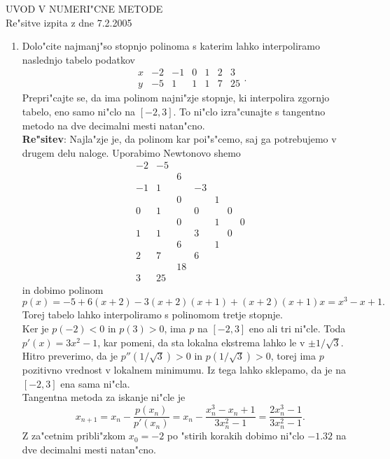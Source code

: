 

\begin{center}
  {\large UVOD V NUMERI"CNE METODE\\
    Re"sitve izpita z dne 7.2.2005\\
    }
\end{center}
\vspace{0.5cm}

\begin{enumerate}

  \item Dolo"cite najmanj"so stopnjo polinoma s katerim
    lahko interpoliramo naslednjo tabelo podatkov
    $$\begin{array}{r|rrrrrr}
      x & -2 & -1 & 0 & 1 & 2 & 3\\ \hline
      y & -5 & 1  & 1 & 1 & 7 & 25
      \end{array}.
    $$
    Prepri"cajte se, da ima polinom najni"zje stopnje, ki interpolira
    zgornjo tabelo, eno samo ni"clo na $[-2,3]$. To ni"clo izra"cunajte s
    tangentno metodo na dve decimalni mesti natan"cno.\\
    {\bf Re"sitev}: Najla"zje je, da polinom kar poi"s"cemo, saj ga
    potrebujemo v drugem delu naloge. Uporabimo Newtonovo shemo
    $$\begin{array}{rrrrrrr}
      -2 & -5 &   &   &   &   &\\
         &    & 6 &   &   &   &\\
      -1 &  1 &   & -3&   &   &\\
         &    & 0 &   & 1 &   &\\
       0 &  1 &   & 0 &   & 0 &\\
         &    & 0 &   & 1 &   &0\\
       1 &  1 &   & 3 &   & 0 &\\
         &    & 6 &   & 1 &   &\\
       2 &  7 &   & 6 &   &   &\\
         &    & 18&   &   &   &\\
       3 & 25 &   &   &   &   &
      \end{array}
    $$
    in dobimo polinom 
    $$p(x)=-5+6(x+2)-3(x+2)(x+1)+(x+2)(x+1)x=
    x^3-x+1.$$ 
    Torej tabelo lahko interpoliramo s polinomom tretje stopnje.\\
    Ker je $p(-2)<0$ in $p(3)>0$, ima $p$ na $[-2,3]$ eno ali tri ni"cle.
    Toda $p'(x)=3x^2-1$, kar pomeni, da sta lokalna ekstrema lahko le
    v $\pm 1/\sqrt{3}$. Hitro preverimo, da je $p''(1/\sqrt{3})>0$ in
    $p(1/\sqrt{3})>0$, torej ima $p$ pozitivno vrednost v lokalnem
    minimumu. Iz tega lahko sklepamo, da je na $[-2,3]$ ena sama ni"cla.\\
    Tangentna metoda za iskanje ni"cle je
    $$x_{n+1}=x_n-\frac{p(x_n)}{p'(x_n)}=x_n-\frac{x_n^3-x_n+1}{3x_n^2-1}=
    \frac{2x_n^3-1}{3x_n^2-1}.$$
    Z za"cetnim pribli"zkom $x_0=-2$ po "stirih korakih dobimo ni"clo $-1.32$
    na dve decimalni mesti natan"cno.


\end{enumerate}
